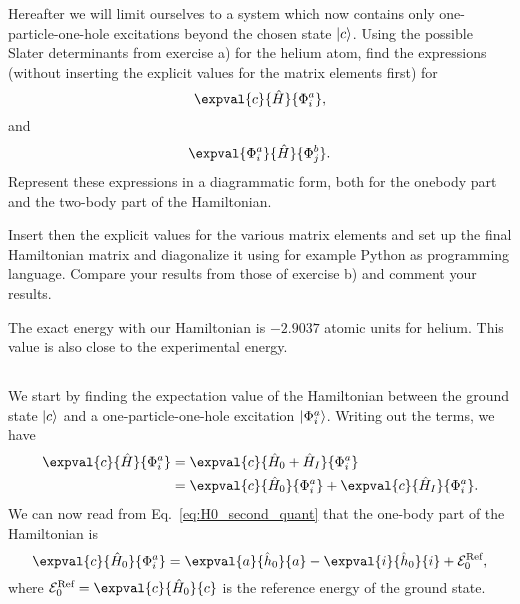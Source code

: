 Hereafter we will limit ourselves to a system which now contains only one-particle-one-hole excitations beyond the chosen state $\lvert c\rangle$.
Using the possible Slater determinants from exercise a) for the helium atom, find the expressions (without inserting the explicit values for the matrix elements first) for %
\begin{equation*}
    \expval{c}{\hat{H}}{\Phi_i^a},
\end{equation*}
and
\begin{equation*}
    \expval{\Phi_i^a}{\hat{H}}{\Phi_j^b}.
\end{equation*}
Represent these expressions in a diagrammatic form, both for the onebody part and the two-body part of the Hamiltonian.

Insert then the explicit values for the various matrix elements and set up the final Hamiltonian matrix and diagonalize it using for example Python as programming language.
Compare your results from those of exercise b) and comment your results. %

The exact energy with our Hamiltonian is $-2.9037$ atomic units for helium.
This value is also close to the experimental energy.

\subsection{}
We start by finding the expectation value of the Hamiltonian between the ground state $\lvert c\rangle$ and a one-particle-one-hole excitation $\lvert\Phi_i^a\rangle$.
Writing out the terms, we have
\begin{align*}
    \expval{c}{\hat{H}}{\Phi_i^a} &= \expval{c}{\hat{H}_0 + \hat{H}_I}{\Phi_i^a} \\
    &= \expval{c}{\hat{H}_0}{\Phi_i^a} + \expval{c}{\hat{H}_I}{\Phi_i^a}.
\end{align*}
We can now read from Eq.~\eqref{eq:H0_second_quant} that the one-body part of the Hamiltonian is
\begin{equation*}
    \expval{c}{\hat{H}_0}{\Phi_i^a} = \expval{a}{\hat{h}_0}{a} - \expval{i}{\hat{h}_0}{i} + \mathcal{E}_0^{\text{Ref}},
\end{equation*}
where $\mathcal{E}_0^{\text{Ref}} = \expval{c}{\hat{H}_0}{c}$ is the reference energy of the ground state.

